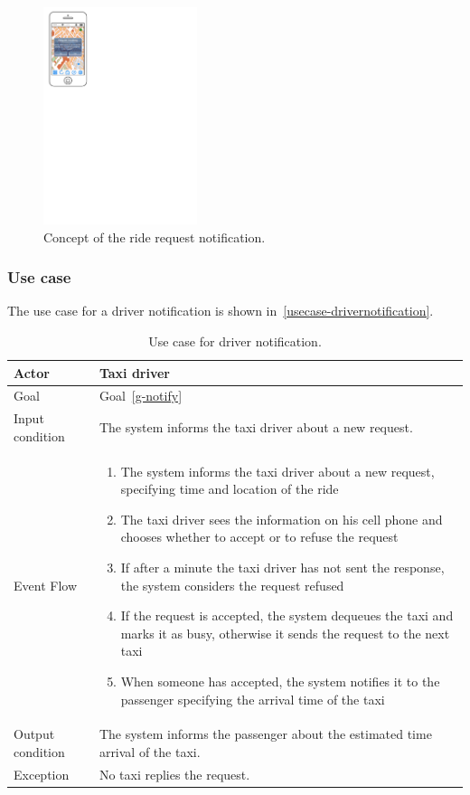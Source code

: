 \begin{figure}
\begin{center}
\includegraphics[width=0.4\textwidth]{mockup/RideRequest.pdf}
\caption{Concept of the ride request notification.}
\label{fig:mockup-riderequest}
\end{center}
\end{figure}

\subsubsection{Use case}
The use case for a driver notification is shown in~\autoref{usecase-drivernotification}.

\begin{table}
\begin{center}
\begin{tabular}{| l | p{} |}
\hline
Actor & Taxi driver \\
\hline
Goal & Goal~\ref{g-notify}
\\
\hline
Input condition & The system informs the taxi driver about a new request.  \\
\hline
Event Flow & \begin{enumerate}
	\item The system informs the taxi driver about a new request, specifying time and location of the ride
	\item The taxi driver sees the information on his cell phone and chooses whether to accept or to refuse the request
	\item If after a minute the taxi driver has not sent the response, the system considers the request refused
	\item If the request is accepted,  the system dequeues the taxi and marks it as busy, otherwise it sends the request to the next taxi
	\item When someone has accepted, the system notifies it to the passenger specifying the arrival time of the taxi
	\end{enumerate}
\\
\hline
Output condition & The system informs the passenger about the estimated time arrival of the taxi. \\
\hline
Exception & No taxi replies the request. \\
\hline
\end{tabular}
\end{center}
\caption{Use case for driver notification.}
\label{usecase-drivernotification}
\end{table}

